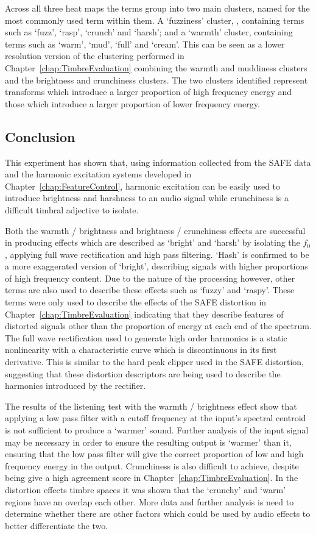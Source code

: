 			Across all three heat maps the terms group into two main clusters, named for the most commonly used
			term within them. A `fuzziness' cluster, , containing terms such as `fuzz', `rasp', `crunch' and
			`harsh'; and a `warmth' cluster, containing terms such as `warm', `mud', `full' and `cream'. This
			can be seen as a lower resolution version of the clustering performed in
			Chapter~\ref{chap:TimbreEvaluation} combining the warmth and muddiness clusters and the brightness
			and crunchiness clusters. The two clusters identified represent transforms which introduce a larger
			proportion of high frequency energy and those which introduce a larger proportion of lower
			frequency energy.

	\subsection{Conclusion}
	\label{sec:PerceptualExperiments-SemanticControl-Conclusion}
		This experiment has shown that, using information collected from the SAFE data and the harmonic excitation
		systems developed in Chapter~\ref{chap:FeatureControl}, harmonic excitation can be easily used to introduce
		brightness and harshness to an audio signal while crunchiness is a difficult timbral adjective to isolate.

		Both the warmth / brightness and brightness / crunchiness effects are successful in producing effects which
		are described as `bright' and `harsh' by isolating the $f_{0}$, applying full wave rectification and high
		pass filtering. `Hash' is confirmed to be a more exaggerated version of `bright', describing signals with
		higher proportions of high frequency content. Due to the nature of the processing however, other terms are
		also used to describe these effects such as `fuzzy' and `raspy'. These terms were only used to describe the
		effects of the SAFE distortion in Chapter~\ref{chap:TimbreEvaluation} indicating that they describe
		features of distorted signals other than the proportion of energy at each end of the spectrum. The full
		wave rectification used to generate high order harmonics is a static nonlinearity with a characteristic
		curve which is discontinuous in its first derivative. This is similar to the hard peak clipper used in the
		SAFE distortion, suggesting that these distortion descriptors are being used to describe the harmonics
		introduced by the rectifier.

		The results of the listening test with the warmth / brightness effect show that applying a low pass filter
		with a cutoff frequency at the input's spectral centroid is not sufficient to produce a `warmer' sound.
		Further analysis of the input signal may be necessary in order to ensure the resulting output is `warmer'
		than it, ensuring that the low pass filter will give the correct proportion of low and high frequency
		energy in the output. Crunchiness is also difficult to achieve, despite being give a high agreement score
		in Chapter~\ref{chap:TimbreEvaluation}. In the distortion effects timbre spaces it was shown that the
		`crunchy' and `warm' regions have an overlap each other. More data and further analysis is need to
		determine whether there are other factors which could be used by audio effects to better differentiate the
		two.

